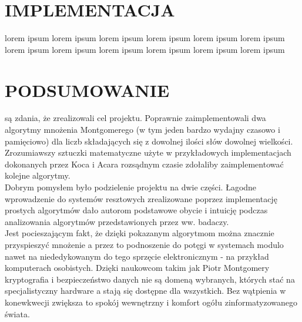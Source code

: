 \documentclass[10pt,journal,compsoc]{IEEEtran}
\begin{document}




\section{IMPLEMENTACJA}
 lorem ipsum lorem ipsum lorem ipsum lorem ipsum lorem ipsum lorem ipsum lorem ipsum lorem ipsum lorem ipsum lorem ipsum lorem ipsum lorem ipsum

\section{PODSUMOWANIE}
 są zdania, że zrealizowali cel projektu. Poprawnie zaimplementowali dwa algorytmy mnożenia Montgomerego (w tym jeden bardzo wydajny czasowo i pamięciowo) dla liczb składających się z dowolnej ilości słów dowolnej wielkości. Zrozumiawszy sztuczki matematyczne użyte w przykładowych implementacjach dokonanych przez Koca i Acara rozsądnym czasie zdołaliby zaimplementować kolejne algorytmy.  \\
Dobrym pomysłem było podzielenie projektu na dwie części. Łagodne wprowadzenie do systemów resztowych zrealizowane poprzez implementację prostych algorytmów dało autorom podstawowe obycie i intuicję podczas analizowania algorytmów przedstawionych przez ww. badaczy. \\
Jest pocieszającym fakt, że dzięki pokazanym algorytmom można znacznie przyspieszyć mnożenie a przez to podnoszenie do potęgi w systemach modulo nawet na niededykowanym do tego sprzęcie elektronicznym - na przykład komputerach osobistych. Dzięki naukowcom takim jak Piotr Montgomery kryptografia i bezpieczeństwo danych nie są domeną wybranych, których stać na specjalistyczny hardware a stają się dostępne dla wszystkich. Bez wątpienia w konewkwecji zwiększa to spokój wewnętrzny i komfort ogółu zinformatyzowanego świata.
\end{document}
